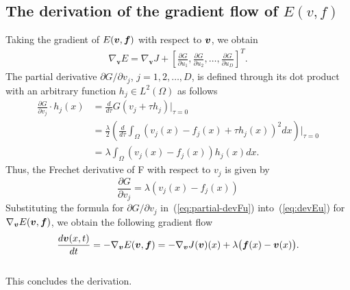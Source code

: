 \subsection{The derivation of the gradient flow of $
 E(v, f)$}
\label{secapp:derE}
 Taking the gradient of $E({\bm v}, {\bm f})$ with respect to ${\bm v}$, we obtain
\label{secapp:djv}
\begin{align}
\label{eq:devEu}
    \nabla_{\bm{v}}E = \nabla_{\bm{v}}J + 
    \left[\frac{\partial G}{\partial u_1}, \frac{\partial G}{\partial u_2}, \dots, \frac{\partial G}{\partial u_{D}} \right]^T.
\end{align}
The partial derivative ${\partial G}/{\partial v_j}$, $j = 1, 2, \dots, D$, is defined through its dot product with an arbitrary function $h_j \in L^{2}(\Omega)$ as follows
\begin{align}
\frac{\partial G}{\partial v_j}\cdot h_j(x) &= \frac{d}{d\tau}G(v_j + \tau h_j)\bigl|_{\tau=0} \nonumber\\
&= \frac{\lambda}{2} \left(\frac{d}{d\tau} \int_{\Omega} (v_j(x) - f_j(x) + \tau h_j(x))^2 dx \right)\biggl|_{\tau=0}  \nonumber\\
&= \lambda \int_{\Omega} (v_j(x) - f_j(x))h_j(x)  dx  \nonumber.
\end{align}
Thus, the Frechet derivative of F with respect to $v_j$ is given by
\begin{equation}
\label{eq:partial-devFu}
\frac{\partial G}{\partial v_j} = \lambda (v_j(x) - f_j(x))
\end{equation}
Substituting the formula for ${\partial G}/{\partial v_j}$ in~(\ref{eq:partial-devFu}) into~(\ref{eq:devEu}) for $\nabla_{{\bm v}}E({\bm v}, {\bm f})$, we obtain the following gradient flow 
\begin{equation}
    \label{eq:gradient-descent-E}
    \frac{d\bm{v}(x,t)}{dt} = -\nabla_{\bm{v}}E({\bm v}, {\bm f}) = -\nabla_{\bm{v}}J({\bm v})(x) + \lambda \bigl({\bm f}(x) - {\bm v}(x)\bigl).
\end{equation}
\\
This concludes the derivation.
